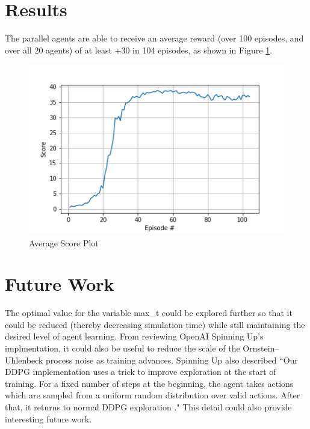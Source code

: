 \documentclass{article}
\begin{document}
\section{Results}
The parallel agents are able to receive an average reward (over 100 episodes, and over all 20 agents) of at least +30 in 104 episodes, as shown in Figure \ref{fig:results}.

\begin{figure}[ht]
\centering
\includegraphics[scale=0.75]{./figures/results.png}
\caption{Average Score Plot}
\label{fig:results}
\end{figure}

\section{Future Work}
The optimal value for the variable max\_t could be explored further so that it could be reduced (thereby decreasing simulation time) while still maintaining the desired level of agent learning. From reviewing \enspace  OpenAI Spinning Up's implmentation, it could also be useful to reduce the scale of the Ornstein–Uhlenbeck process noise as training advances. Spinning Up also described ``Our DDPG implementation uses a trick to improve exploration at the start of training. For a fixed number of steps at the beginning, the agent takes actions which are sampled from a uniform random distribution over valid actions. After that, it returns to normal DDPG exploration \cite{SpinningUp2018} ." This detail could also provide interesting future work. 



\end{document}
